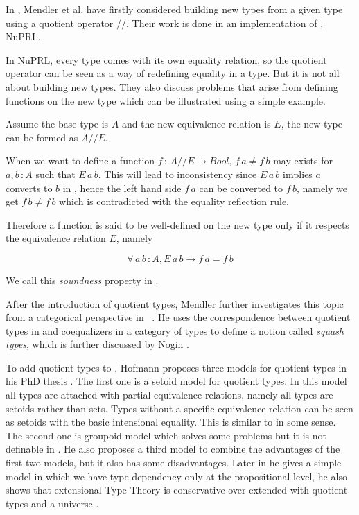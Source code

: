 In \cite{cab}, Mendler et al. have firstly considered building new types from a
given type using a quotient operator $//$. Their work is done in an
implementation of \ett, NuPRL. 

In NuPRL, every type comes with its own equality relation, so the quotient operator can be
seen as a way of redefining equality in a type. But it is not all
about building new types. They also discuss problems that arise from
defining functions on the new type which can be illustrated using a simple example. 

Assume the base type is $A$ and the new equivalence relation is $E$, the new
type can be formed as $A//E$. 

When we want to define a function $f \,\colon\, A//E \to Bool$,  $f\,a \not= f\,b$ may
exists for $a, b \,\colon A$ such that $E\,a\,b$. This will lead to
inconsistency since $E\,a\,b$ implies $a$ converts to $b$ in \ett{}, hence
the left hand side $f\,a$ can be converted to $f\,b$, namely we get $f\,b \not= f\,b$
which is contradicted with the equality reflection rule. 

Therefore a function is said to be well-defined \cite{cab} on the new type only
if it respects the equivalence relation $E$, namely

$$\forall \, a\,b\,\colon A, E\,a\,b \to f\,a = f\,b$$

We call this \emph{soundness} property in \cite{aan}.

 After the introduction of quotient types, Mendler further investigates
 this topic from a categorical perspective in ~\cite{men:90}. He uses
 the correspondence between quotient types in \mltt{} and coequalizers
 in a category of types to define a notion called \emph{squash types},
 which is further discussed by Nogin \cite{nog:02}.

To add quotient types to \mltt{}, Hofmann proposes  three models for
quotient types in his PhD thesis \cite{hof:phd}. The first one is a setoid model for
quotient types. In this model all types are attached with partial
equivalence relations, namely all types are setoids rather than
sets. Types without a specific equivalence relation can be seen as
setoids with the basic intensional equality. This is similar to
\ett{} in some sense. The second one is groupoid model which solves some problems
but it is not definable in \itt{}. He also proposes a third model to
combine the advantages of the first two models, but it also has some
disadvantages. Later in \cite{hof:95:sm} he gives a simple model in which we have type dependency only at the propositional level, he also shows that extensional Type Theory is conservative over \itt  extended with quotient types and a universe \cite{hof:95:con}.

